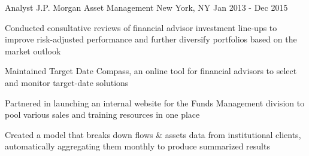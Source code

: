 \begin{cventries}
  \cventry
    {Analyst} %
    {J.P. Morgan Asset Management} %
    {New York, NY} %
    {Jan 2013 - Dec 2015} %
    {
      \begin{cvitems} %
        \item {Conducted consultative reviews of financial advisor investment line-ups to improve risk-adjusted performance and further diversify portfolios based on the market outlook}
        \item {Maintained Target Date Compass, an online tool for financial advisors to select and monitor target-date solutions}
        \item {Partnered in launching an internal website for the Funds Management division to pool various sales and training resources in one place}
        \item {Created a model that breaks down flows \& assets data from institutional clients, automatically aggregating them monthly to produce summarized results}
      \end{cvitems}
    }

\end{cventries}
